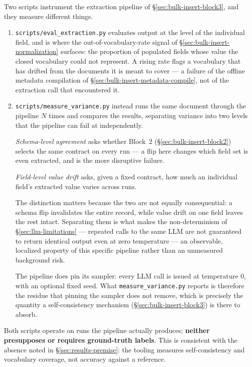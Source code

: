 Two scripts instrument the extraction pipeline of \S\ref{sec:bulk-insert-block3}, and they measure different things.

\begin{enumerate}
\item \texttt{scripts/eval\_extraction.py} evaluates output at the level of the individual field, and is where the out-of-vocabulary-rate signal of \S\ref{sec:bulk-insert-normalization} surfaces: the proportion of populated fields whose value the closed vocabulary could not represent. A rising rate flags a vocabulary that has drifted from the documents it is meant to cover — a failure of the offline metadata compilation of \S\ref{sec:bulk-insert-metadata-compile}, not of the extraction call that encountered it.

\item \texttt{scripts/measure\_variance.py} instead runs the same document through the pipeline $N$ times and compares the results, separating variance into two levels that the pipeline can fail at independently. 

\emph{Schema-level agreement} asks whether Block~2 (\S\ref{sec:bulk-insert-block2}) selects the same contract on every run — a flip here changes which field set is even extracted, and is the more disruptive failure. 

\emph{Field-level value drift} asks, given a fixed contract, how much an individual field's extracted value varies across runs. 

The distinction matters because the two are not equally consequential: a schema flip invalidates the entire record, while value drift on one field leaves the rest intact. Separating them is what makes the non-determinism of \S\ref{sec:llm-limitations} — repeated calls to the same LLM are not guaranteed to return identical output even at zero temperature \citep{he2025defeating} — an observable, localized property of this specific pipeline rather than an unmeasured background risk. 

The pipeline does pin its sampler: every LLM call is issued at temperature 0, with an optional fixed seed. What \texttt{measure\_variance.py} reports is therefore the residue that pinning the sampler does not remove, which is precisely the quantity a self-consistency mechanism (\S\ref{sec:bulk-insert-block3}) is there to absorb.

\end{enumerate}

Both scripts operate on runs the pipeline actually produces; \textbf{neither presupposes or requires ground-truth labels}. This is consistent with the absence noted in \S\ref{sec:results-premise}: the tooling measures self-consistency and vocabulary coverage, not accuracy against a reference.

